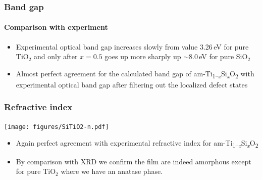 \documentclass[noamsthm,8pt,t]{beamer}
\def\TiSiO{Ti\textsubscript{1--\itshape x}Si\textsubscript{\itshape x}O\textsubscript{2}}
\begin{document}
\begin{frame}
   \frametitle{Band gap}
   \framesubtitle{Comparison with experiment}

   \begin{center}
   \end{center}

   \begin{itemize}
      \item Experimental optical band gap increases slowly from value 3.26\,eV for pure TiO$_2$ and only after $x = 0.5$ goes up more sharply up $\sim$8.0\,eV for pure SiO$_2$
      \item<2> Almost perfect agreement for the calculated band gap of am-\TiSiO{} with experimental optical band gap after filtering out the localized defect states
   \end{itemize}
\end{frame}

\begin{frame}
\frametitle{Refractive index}
   \vspace{-0.3cm}
   \begin{center}
      \texttt{[image: figures/SiTiO2-n.pdf]}
   \end{center}

   \begin{itemize}
      \item Again perfect agreement with experimental refractive index for am-\TiSiO{}
      \item<2> By comparison with XRD we confirm the film are indeed amorphous except for pure TiO$_2$ where we have an anatase phase.
   \end{itemize}

   \begin{center}
   \end{center}

\end{frame}
\end{document}
